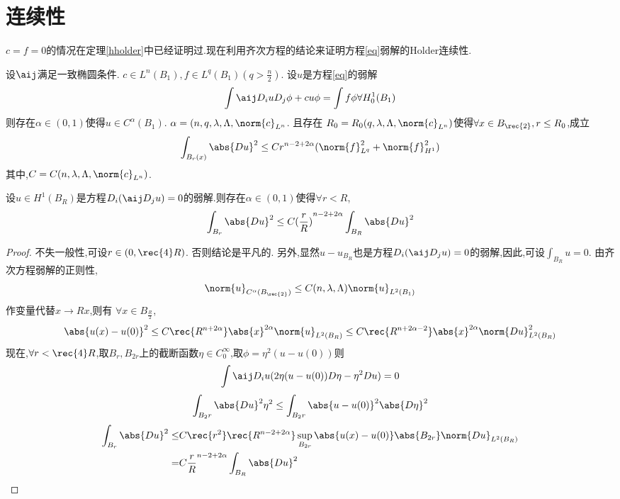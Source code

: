 \section{\texorpdfstring{\Holder}{Holder}连续性}
$c=f=0$的情况在定理\eqref{hholder}中已经证明过.现在利用齐次方程的结论来证明方程\eqref{eq}弱解的Holder连续性.
\begin{theorem}\label{holder}
    设$\aij$满足一致椭圆条件. $c \in L^n(B_1), f\in L^q(B_1)(q > \frac{n}{2})$. 设$u$是方程\eqref{eq}的弱解
    \begin{equation}
        \int \aij D_iu D_j\phi + cu\phi = \int f \phi \forall  H^1_0(B_1)
    \end{equation}
    则存在$\alpha \in (0,1)$使得$u \in C^\alpha(B_1)$. $\alpha=(n,q,\lambda,\Lambda,\norm{c}_{L^n}$. 且存在 $R_0=R_0(q,\lambda,\Lambda,\norm{c}_{L^n})$使得$\forall  x\in B_\rec{2}, r \le R_0$,成立 
    \begin{equation}
        \int_{B_r(x)}\abs{Du}^2 \le Cr^{n-2+2\alpha}(\norm{f}^2_{L^q}+\norm{f}^2_{H^1})
    \end{equation}
    其中,$C=C(n,\lambda,\Lambda,\norm{c}_{L^n})$.
\end{theorem}
\begin{lemma} 
    设$u \in H^1(B_R)$是方程$D_i(\aij D_j u)=0$的弱解.则存在$\alpha \in (0,1)$使得$\forall r < R$, 
    \begin{equation}
        \int_{B_r}\abs{Du}^2 \le C{(\frac{r}{R})}^{n-2+2\alpha}\int_{B_R}\abs{Du}^2
    \end{equation}
\end{lemma}
\begin{proof}
    不失一般性,可设$r \in (0,\rec{4}R)$. 否则结论是平凡的. 另外,显然$u-u_{B_R}$也是方程$D_i(\aij D_ju)=0$的弱解,因此,可设$\int_{B_R}u=0$. 由齐次方程弱解的正则性,
    \begin{equation}
        \norm{u}_{C^\alpha(B_\rec{2})} \le C(n,\lambda,\Lambda) \norm{u}_{L^2(B_1)}
    \end{equation}
    作变量代替$x \to Rx$,则有 $\forall x \in B_{\frac{R}{2}}$,
    \begin{equation}
        \abs{u(x)-u(0)}^2 \le C\rec{R^{n+2\alpha}}\abs{x}^{2\alpha}\norm{u}_{L^2(B_R)} \le C\rec{R^{n+2\alpha-2}}\abs{x}^{2\alpha} \norm{Du}^2_{L^2(B_R)}
    \end{equation}
    现在,$\forall r < \rec{4}R$,取$B_r, B_{2r}$上的截断函数$\eta \in C^\infty_0$,取$\phi=\eta^2(u-u(0))$则 
    \begin{equation}
        \int \aij D_iu(2\eta(u-u(0))D\eta-\eta^2 Du)=0
    \end{equation}
    \begin{equation}
        \int_{B_2r}\abs{Du}^2\eta^2 \le\int_{B_2r}\abs{u-u(0)}^2\abs{D\eta}^2
    \end{equation}
    \begin{equation}
        \begin{split}
            \int_{B_r}\abs{Du}^2 \le & C\rec{r^2} \rec{R^{n-2+2\alpha}} \sup_{B_{2r}}\abs{u(x)-u(0)}\abs{B_{2r}}\norm{Du}_{L^2(B_R)} \\
            =&C\frac{r}{R}^{n-2+2\alpha}\int_{B_R}\abs{Du}^2
        \end{split}
    \end{equation}
\end{proof}
